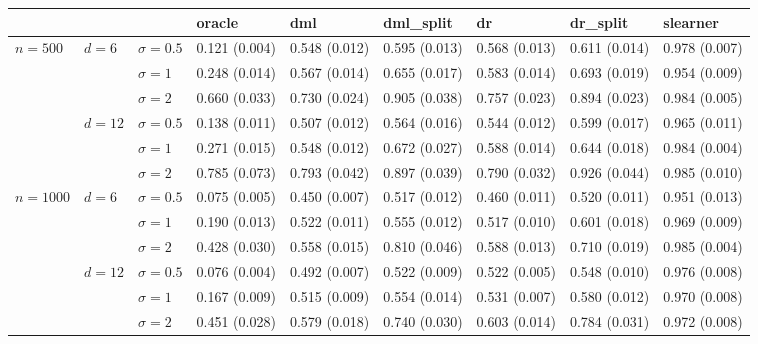 \documentclass[11pt]{article} %
\theoremstyle{theorem}  %
\theoremstyle{plain}
\begin{document}
\begin{figure}[H]
\scriptsize
\centering
\begin{tabular}{lllllllll}
\toprule
         &        &            &         oracle &            dml &     dml\_split &             dr &      dr\_split &       slearner \\
\midrule
\multirow{6}{*}{$n=500$} & \multirow{3}{*}{$d=6$} & $\sigma=0.5$ &  0.121 (0.004) &  0.548 (0.012) &  0.595 (0.013) &  0.568 (0.013) &  0.611 (0.014) &  0.978 (0.007) \\
         &        & $\sigma=1$ &  0.248 (0.014) &  0.567 (0.014) &  0.655 (0.017) &  0.583 (0.014) &  0.693 (0.019) &  0.954 (0.009) \\
         &        & $\sigma=2$ &  0.660 (0.033) &  0.730 (0.024) &  0.905 (0.038) &  0.757 (0.023) &  0.894 (0.023) &  0.984 (0.005) \\
\cline{2-9}
         & \multirow{3}{*}{$d=12$} & $\sigma=0.5$ &  0.138 (0.011) &  0.507 (0.012) &  0.564 (0.016) &  0.544 (0.012) &  0.599 (0.017) &  0.965 (0.011) \\
         &        & $\sigma=1$ &  0.271 (0.015) &  0.548 (0.012) &  0.672 (0.027) &  0.588 (0.014) &  0.644 (0.018) &  0.984 (0.004) \\
         &        & $\sigma=2$ &  0.785 (0.073) &  0.793 (0.042) &  0.897 (0.039) &  0.790 (0.032) &  0.926 (0.044) &  0.985 (0.010) \\
\cline{1-9}
\cline{2-9}
\multirow{6}{*}{$n=1000$} & \multirow{3}{*}{$d=6$} & $\sigma=0.5$ &  0.075 (0.005) &  0.450 (0.007) &  0.517 (0.012) &  0.460 (0.011) &  0.520 (0.011) &  0.951 (0.013) \\
         &        & $\sigma=1$ &  0.190 (0.013) &  0.522 (0.011) &  0.555 (0.012) &  0.517 (0.010) &  0.601 (0.018) &  0.969 (0.009) \\
         &        & $\sigma=2$ &  0.428 (0.030) &  0.558 (0.015) &  0.810 (0.046) &  0.588 (0.013) &  0.710 (0.019) &  0.985 (0.004) \\
\cline{2-9}
         & \multirow{3}{*}{$d=12$} & $\sigma=0.5$ &  0.076 (0.004) &  0.492 (0.007) &  0.522 (0.009) &  0.522 (0.005) &  0.548 (0.010) &  0.976 (0.008) \\
         &        & $\sigma=1$ &  0.167 (0.009) &  0.515 (0.009) &  0.554 (0.014) &  0.531 (0.007) &  0.580 (0.012) &  0.970 (0.008) \\
         &        & $\sigma=2$ &  0.451 (0.028) &  0.579 (0.018) &  0.740 (0.030) &  0.603 (0.014) &  0.784 (0.031) &  0.972 (0.008) \\

\end{tabular}
\end{figure}
\end{document}
